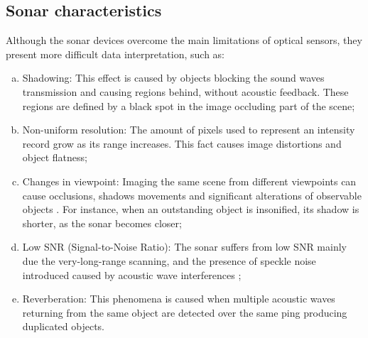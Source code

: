 \documentclass[final,5p,times]{elsarticle}
\begin{document}

\subsection{Sonar characteristics}
\label{sonar:characteristics}

Although the sonar devices overcome the main limitations of optical sensors, they present more difficult data interpretation, such as:

\begin{enumerate}[(a)]
    \item Shadowing: This effect is caused by objects blocking the sound waves transmission and causing regions behind, without acoustic feedback. These regions are defined by a black spot in the image occluding part of the scene;
    \item Non-uniform resolution: The amount of pixels used to represent an intensity record grow as its range increases. This fact causes image distortions and object flatness;
    \item Changes in viewpoint: Imaging the same scene from different viewpoints can cause occlusions, shadows movements and significant alterations of observable objects \cite{hurtos2014}. For instance, when an outstanding object is insonified, its shadow is shorter, as the sonar becomes closer;
    \item Low SNR (Signal-to-Noise Ratio): The sonar suffers from low SNR mainly due the very-long-range scanning, and the presence of speckle noise introduced caused by acoustic wave interferences \cite{abbott1979};
    \item Reverberation: This phenomena is caused when multiple acoustic waves returning from the same object are detected over the same ping producing duplicated objects.
\end{enumerate}

\end{document}

